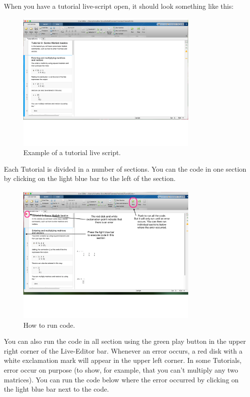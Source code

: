 \documentclass[11pt]{article}
\begin{document}
\vspace{2mm}
\noindent
When you have a tutorial live-script open, it should look something like this:
\begin{figure}[h!]
\centering
\includegraphics[width=0.8\textwidth]{OpenTutorial.pdf}
\caption{
Example of a tutorial live script.
}
\end{figure}

\newpage
\noindent
Each Tutorial is divided in a number of sections.
You can the code in one section by clicking on the light blue bar
to the left of the section. 
\begin{figure}[h!]
\centering
\includegraphics[width=0.8\textwidth]{RunCode.pdf}
\caption{
How to run code.
}
\end{figure}
You can also run the code in all section using the green play button
in the upper right corner of the Live-Editor bar.
Whenever an error occurs, 
a red disk with a white exclamation mark will appear in the upper left corner.
In some Tutorials, error occur on purpose (to show, for example,
that you can't multiply any two matrices).
You can run the code below where the error occurred
by clicking on the light blue bar next to the code.
\end{document}
